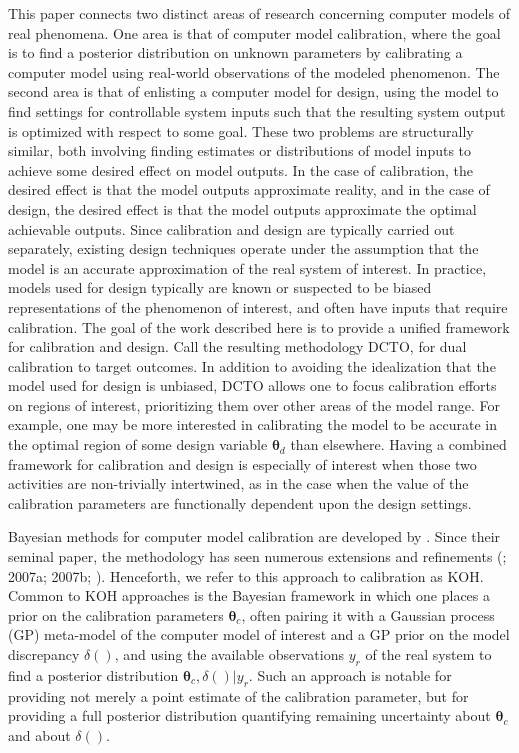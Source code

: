 \documentclass[12pt]{article}
\begin{document}
%
This paper connects two distinct areas of research concerning computer models of real phenomena.
%
One area is that of computer model calibration, where the goal is to find a posterior distribution on unknown parameters by calibrating a computer model using real-world observations of the modeled phenomenon.
%
The second area is that of enlisting a computer model for design, using the model to find settings for controllable system inputs such that the resulting system output is optimized with respect to some goal.
%
These two problems are structurally similar, both involving finding estimates or distributions of model inputs to achieve some desired effect on model outputs.
%
In the case of calibration, the desired effect is that the model outputs approximate reality, and in the case of design, the desired effect is that the model outputs approximate the optimal achievable outputs.
%
Since calibration and design are typically carried out separately, existing design techniques operate under the assumption that the model is an accurate approximation of the real system of interest.
%
In practice, models used for design typically are known or suspected to be biased representations of the phenomenon of interest, and often have inputs that require calibration.
%
The goal of the work described here is to provide a unified framework for calibration and design.
%
Call the resulting methodology DCTO, for dual calibration to target outcomes.
%
In addition to avoiding the idealization that the model used for design is unbiased, DCTO allows one to focus calibration efforts on regions of interest, prioritizing them over other areas of the model range.
%
For example, one may be more interested in calibrating the model to be accurate in the optimal region of some design variable $\boldsymbol \theta_d$ than elsewhere.
%
Having a combined framework for calibration and design is especially of interest when those two activities are non-trivially intertwined, as in the case when the value of the calibration parameters are functionally dependent upon the design settings.
%

%
Bayesian methods for computer model calibration are developed by \cite{Kennedy2001}.
%
Since their seminal paper, the methodology has seen numerous extensions and refinements (\citealt{Higdon2004,Williams2006}; \citeauthor{Bayarri2007a} 2007a; \citeauthor{Bayarri2007b} 2007b; \citealt{Paulo2012,Brynjarsdottir2014}).
%
Henceforth, we refer to this approach to calibration as KOH.
%
Common to KOH approaches is the Bayesian framework in which one places a prior on the calibration parameters $\boldsymbol \theta_c$, often pairing it with a Gaussian process (GP) meta-model of the computer model of interest and a GP prior on the model discrepancy $\delta()$, and using the available observations $y_r$ of the real system to find a posterior distribution $\boldsymbol\theta_c,\delta()|y_r$.
%
Such an approach is notable for providing not merely a point estimate of the calibration parameter, but for providing a full posterior distribution quantifying remaining uncertainty about $\boldsymbol\theta_c$ and about $\delta()$.
%
\end{document}
